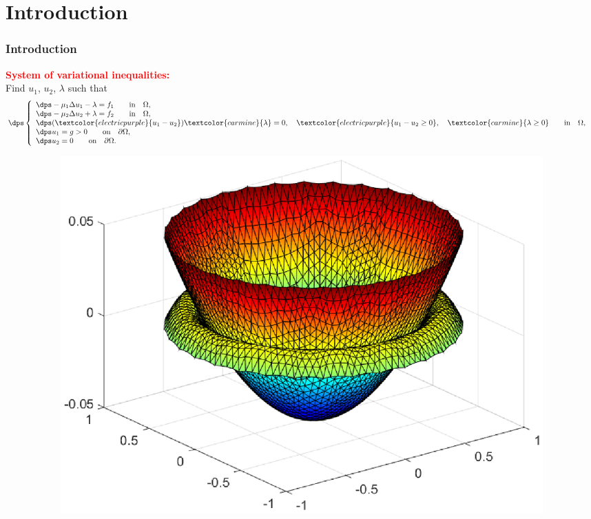 \documentclass[10 pt]{beamer}
\begin{document}
\section{Introduction}
\begin{frame}[t]
\frametitle{Introduction}
\textcolor{red}{\textbf{System of variational inequalities:}}\\
Find $u_1$, $u_2$, $\lambda$ such that
\begin{equation*}
\dps
\left\lbrace\begin{array}{llccc}
\dps -\mu_1 \Delta u_1-\lambda = f_1 \qquad \mbox{in} \quad \Omega, \\
\dps -\mu_2 \Delta u_2+\lambda = f_2 \qquad \mbox{in} \quad \Omega,\\
\dps (\textcolor{electricpurple}{u_1-u_2})\textcolor{carmine}{\lambda}=0, \quad \textcolor{electricpurple}{u_1-u_2 \geq 0}, \quad 
\textcolor{carmine}{\lambda \geq 0} \qquad \mbox{in} \quad \Omega, \hspace{0.2 cm}\\
\dps u_1=g > 0 \qquad \mbox{on} \quad\partial \Omega,\\
\dps u_2=0 \qquad \mbox{on} \quad\partial \Omega.
\end{array}
\right.
\end{equation*}
\vspace{-0.75cm}
\begin{figure}[t]
\begin{subfigure}[normal]{0.5\textwidth} 
\includegraphics[width=\textwidth]{position_membrane_exact_resolution_convergence.eps}    
\label{ref:position_membrane_convergence}


\end{subfigure}
\end{figure}
\end{frame}
\end{document}
